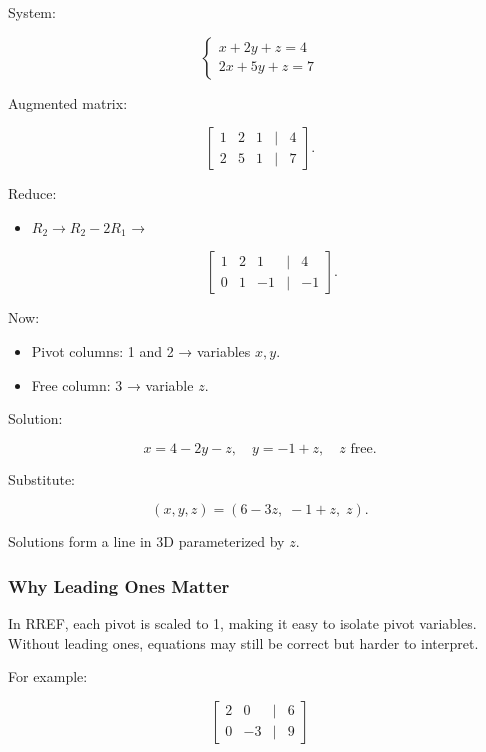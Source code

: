 \documentclass[
  letterpaper,
  DIV=11,
  numbers=noendperiod]{scrreprt}
\providecommand{\tightlist}{%
  \setlength{\itemsep}{0pt}\setlength{\parskip}{0pt}}
\begin{document}
System:

\[
\begin{cases}  
x + 2y + z = 4 \\  
2x + 5y + z = 7  
\end{cases}
\]

Augmented matrix:

\[
\begin{bmatrix}  
1 & 2 & 1 & | & 4 \\  
2 & 5 & 1 & | & 7  
\end{bmatrix}.
\]

Reduce:

\begin{itemize}
\item
  \(R_2 \to R_2 - 2R_1\) →

  \[
  \begin{bmatrix}  
  1 & 2 & 1 & | & 4 \\  
  0 & 1 & -1 & | & -1  
  \end{bmatrix}.
  \]
\end{itemize}

Now:

\begin{itemize}
\tightlist
\item
  Pivot columns: 1 and 2 → variables \(x, y\).
\item
  Free column: 3 → variable \(z\).
\end{itemize}

Solution:

\[
x = 4 - 2y - z, \quad y = -1 + z, \quad z \text{ free}.
\]

Substitute:

\[
(x, y, z) = (6 - 3z, \; -1 + z, \; z).
\]

Solutions form a line in 3D parameterized by \(z\).

\subsubsection{Why Leading Ones Matter}\label{why-leading-ones-matter}

In RREF, each pivot is scaled to 1, making it easy to isolate pivot
variables. Without leading ones, equations may still be correct but
harder to interpret.

For example:

\[
\begin{bmatrix}  
2 & 0 & | & 6 \\  
0 & -3 & | & 9  
\end{bmatrix}
\]
\end{document}
